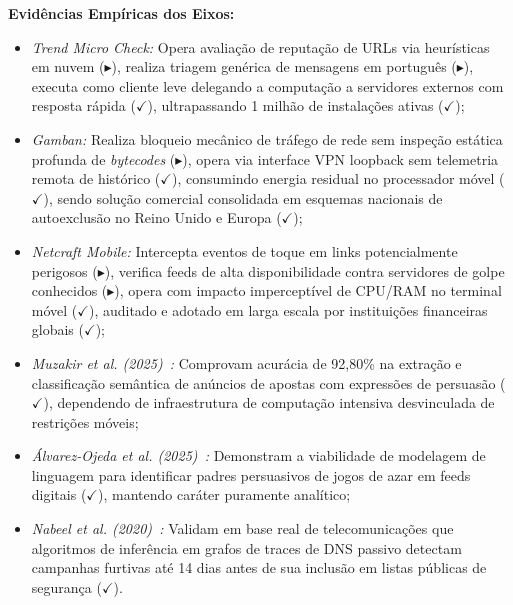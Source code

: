 \noindent\textbf{Evid\^{e}ncias Emp\'{i}ricas dos Eixos:}
\begin{itemize}
    \item \textit{Trend Micro Check:} Opera avalia\c{c}\~{a}o de reputa\c{c}\~{a}o de URLs via heur\'{i}sticas em nuvem ($\blacktriangleright$), realiza triagem gen\'{e}rica de mensagens em portugu\^{e}s ($\blacktriangleright$), executa como cliente leve delegando a computa\c{c}\~{a}o a servidores externos com resposta r\'{a}pida ($\checkmark$), ultrapassando 1 milh\~{a}o de instala\c{c}\~{o}es ativas ($\checkmark$);
    \item \textit{Gamban:} Realiza bloqueio mec\^{a}nico de tr\'{a}fego de rede sem inspe\c{c}\~{a}o est\'{a}tica profunda de \textit{bytecodes} ($\blacktriangleright$), opera via interface VPN loopback sem telemetria remota de hist\'{o}rico ($\checkmark$), consumindo energia residual no processador m\'{o}vel ($\checkmark$), sendo solu\c{c}\~{a}o comercial consolidada em esquemas nacionais de autoexclus\~{a}o no Reino Unido e Europa ($\checkmark$);
    \item \textit{Netcraft Mobile:} Intercepta eventos de toque em links potencialmente perigosos ($\blacktriangleright$), verifica feeds de alta disponibilidade contra servidores de golpe conhecidos ($\blacktriangleright$), opera com impacto impercept\'{i}vel de CPU/RAM no terminal m\'{o}vel ($\checkmark$), auditado e adotado em larga escala por institui\c{c}\~{o}es financeiras globais ($\checkmark$);
    \item \textit{Muzakir et al. (2025)~\cite{muzakir2025text}:} Comprovam acur\'{a}cia de 92,80\% na extra\c{c}\~{a}o e classifica\c{c}\~{a}o sem\^{a}ntica de an\'{u}ncios de apostas com express\~{o}es de persuas\~{a}o ($\checkmark$), dependendo de infraestrutura de computa\c{c}\~{a}o intensiva desvinculada de restri\c{c}\~{o}es m\'{o}veis;
    \item \textit{\'{A}lvarez-Ojeda et al. (2025)~\cite{alvarezojeda2025precom}:} Demonstram a viabilidade de modelagem de linguagem para identificar padres persuasivos de jogos de azar em feeds digitais ($\checkmark$), mantendo car\'{a}ter puramente anal\'{i}tico;
    \item \textit{Nabeel et al. (2020)~\cite{nabeel2020following}:} Validam em base real de telecomunica\c{c}\~{o}es que algoritmos de infer\^{e}ncia em grafos de traces de DNS passivo detectam campanhas furtivas at\'{e} 14 dias antes de sua inclus\~{a}o em listas p\'{u}blicas de seguran\c{c}a ($\checkmark$).
\end{itemize}

